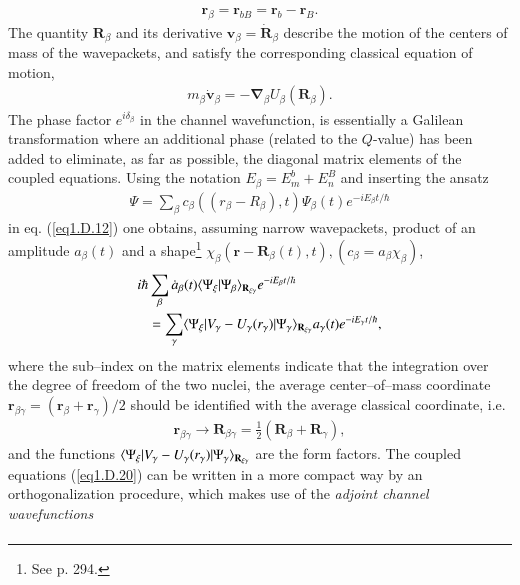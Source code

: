 \begin{subappendices}
\begin{align}\label{eq1.D.17}
\mathbf r_\beta=\mathbf r_{bB}=\mathbf r_b-\mathbf r_B.
\end{align}
The quantity $\mathbf R_\beta$ and its derivative $\mathbf v_\beta=\mathbf{\dot R}_\beta$ describe the motion of the centers of mass of the wavepackets, and satisfy the corresponding classical equation of motion,
\begin{align}\label{eq1.D.18}
m_\beta\mathbf{\dot v}_\beta=-\boldsymbol\nabla_\beta U_\beta(\mathbf R_\beta).
\end{align}
The phase factor $e^{i\delta_\beta}$ in the channel wavefunction, is essentially a Galilean transformation where an additional phase (related to the $Q$-value) has been added to eliminate, as far as possible, the diagonal matrix elements of the coupled equations. Using the notation $E_\beta=E_m^b+E_n^B$ and inserting the ansatz
\begin{align}\label{eq1.D.19}
\Psi=\sum_{\beta}c_\beta((r_\beta-R_\beta),t)\Psi_\beta(t)e^{-iE_\beta t/\hbar}
\end{align}
in eq. (\ref{eq1.D.12}) one obtains, assuming narrow wavepackets, product of an amplitude $a_\beta(t)$ and a shape\footnote{See \cite{Broglia:04a} p. 294.} $\chi_\beta(\mathbf r-\mathbf R_\beta(t),t), (c_\beta=a_\beta\chi_\beta)$,
\begin{align}\label{eq1.D.20}
\nonumber i\hbar & \sum_{\beta}\dot a_\beta(t)\langle {\Psi_\xi|\Psi_\beta} \rangle_{\mathbf R_{\xi\gamma}}e^{-iE_\beta t/\hbar}\\
&=\sum_{\gamma}\langle {\Psi_\xi|V_\gamma-U_\gamma(r_\gamma)|\Psi_\gamma} \rangle_{\mathbf R_{\xi\gamma}}a_\gamma(t)e^{-iE_\gamma t/\hbar},
\end{align}
where the sub--index on the matrix elements indicate that the integration over the degree of freedom of the two nuclei, the average center--of--mass coordinate $\mathbf r_{\beta\gamma}=(\mathbf r_\beta+\mathbf r_\gamma)/2$ should be identified with the average classical coordinate, i.e.
\begin{align}\label{eq1.D.21}
\mathbf r_{\beta\gamma}\rightarrow\mathbf R_{\beta\gamma}=\frac{1}{2}(\mathbf R_\beta+\mathbf R_\gamma),
\end{align}
and the functions $\langle {\Psi_\xi|V_\gamma-U_\gamma(r_\gamma)|\Psi_\gamma} \rangle_{\mathbf R_{\xi\gamma}}$
 are the form factors. The coupled equations (\ref{eq1.D.20}) can be written in a more compact way by an orthogonalization procedure, which makes use of the \textit{adjoint channel wavefunctions}
\begin{align}\label{eq1.D.22}

\end{align}
\end{subappendices}
